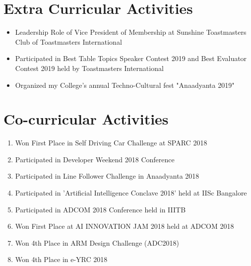 \documentclass[12pt,a4paper,sans]{moderncv} %
\begin{document}

\section{Extra Curricular Activities}

\begin{itemize}
	\item Leadership Role of Vice President of Membership at Sunshine Toastmasters Club of Toastmasters International
	\item Participated in Best Table Topics Speaker Contest 2019 and Best Evaluator Contest 2019 held by Toastmasters International
	\item Organized my College's annual Techno-Cultural fest "Anaadyanta 2019" 
\end{itemize}
\hfill
\hfill
\hfill
\hfill
\hfill
\break
\section{Co-curricular Activities}

\begin{enumerate}
	\item Won First Place in Self Driving Car Challenge at SPARC 2018
	\item Participated in Developer Weekend 2018 Conference
	\item Participated in Line Follower Challenge in Anaadyanta 2018
	\item Participated in 'Artificial Intelligence Conclave 2018' held at IISc Bangalore
	\item Participated in ADCOM 2018 Conference held in IIITB
	\item Won First Place at AI INNOVATION JAM 2018 held at ADCOM 2018
	\item Won 4th Place in ARM Design Challenge (ADC2018)
	\item Won 4th Place in e-YRC 2018 
	
\end{enumerate}
\end{document}
